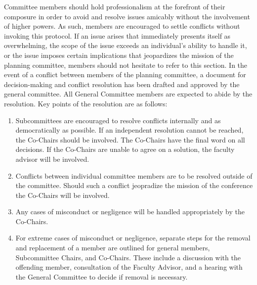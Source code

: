 Committee members should hold professionalism at the forefront of their composure in order to avoid and resolve issues amicably without the involvement of higher powers. As such, members are encouraged to settle conflicts without invoking this protocol. If an issue arises that immediately presents itself as overwhelming, the scope of the issue exceeds an individual’s ability to handle it, or the issue imposes certain implications that jeopardizes the mission of the planning committee, members should not hesitate to refer to this section. In the event of a conflict between members of the planning committee, a document for decision-making and
conflict resolution has been drafted and approved by the general committee. All General Committee members
are expected to abide by the resolution. Key points of the resolution are as follows:
\begin{enumerate}
	\item Subcommittees are encouraged to resolve conflicts internally and as democratically as possible. If an independent resolution cannot be reached, the Co-Chairs should be involved. The Co-Chairs have the final word on all decisions. If the Co-Chairs are unable to agree on a solution, the faculty advisor will be involved.
	\item Conflicts between individual committee members are to be resolved outside of the committee. Should such a conflict jeopradize the mission of the conference the Co-Chairs will be involved.
	\item Any cases of misconduct or negligence will be handled appropriately by the Co-Chairs.
	\item For extreme cases of misconduct or negligence, separate steps for the removal and replacement of a
	member are outlined for general members, Subcommittee Chairs, and Co-Chairs. These include
	a discussion with the offending member, consultation of the Faculty Advisor, and a hearing with the
	General Committee to decide if removal is necessary.
\end{enumerate}

